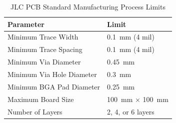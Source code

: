 \begin{table}[ht]
    \centering
    \caption{JLC PCB Standard Manufacturing Process Limits}
    \label{tab:jlc_limits}
    \begin{tabular}{ll}
        \hline
        \textbf{Parameter} & \textbf{Limit} \\
        \hline
        Minimum Trace Width & \SI{0.1}{\milli\meter} (4 mil) \\
        Minimum Trace Spacing & \SI{0.1}{\milli\meter} (4 mil) \\
        Minimum Via Diameter & \SI{0.45}{\milli\meter} \\
        Minimum Via Hole Diameter & \SI{0.3}{\milli\meter} \\
        Minimum BGA Pad Diameter & \SI{0.25}{\milli\meter} \\
        Maximum Board Size & \SI{100}{\milli\meter} × \SI{100}{\milli\meter} \\
        Number of Layers & 2, 4, or 6 layers \\
        \hline
    \end{tabular}
\end{table}

